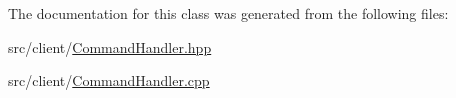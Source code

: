 The documentation for this class was generated from the following files\+:\begin{DoxyCompactItemize}
\item 
src/client/\mbox{\hyperlink{_command_handler_8hpp}{Command\+Handler.\+hpp}}\item 
src/client/\mbox{\hyperlink{_command_handler_8cpp}{Command\+Handler.\+cpp}}\end{DoxyCompactItemize}
